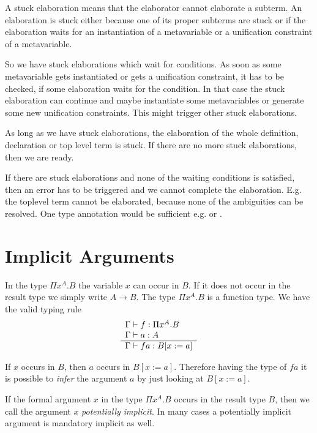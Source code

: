 A stuck elaboration means that the elaborator cannot elaborate a subterm. An
elaboration is stuck either because one of its proper subterms are stuck or if
the elaboration waits for an instantiation of a metavariable or a unification
constraint of a metavariable.

So we have stuck elaborations which wait for conditions. As soon as some
metavariable gets instantiated or gets a unification constraint, it has to be
checked, if some elaboration waits for the condition. In that case the stuck
elaboration can continue and maybe instantiate some metavariables or generate
some new unification constraints. This might trigger other stuck elaborations.

As long as we have stuck elaborations, the elaboration of the whole definition,
declaration or top level term is stuck. If there are no more stuck elaborations,
then we are ready.

If there are stuck elaborations and none of the waiting conditions is satisfied,
then an error has to be triggered and we cannot complete the elaboration. E.g.
the toplevel term  cannot be elaborated, because none of the
ambiguities can be resolved. One type annotation would be sufficient e.g.
 or .





\section{Implicit Arguments}


In the type $\Pi x^A. B$ the variable $x$ can occur in $B$. If it does not occur
in the result type we simply write $A \to B$. The type $\Pi x^A. B$ is a
function type. We have the valid typing rule
$$
\rulev{
    \Gamma \vdash f: \Pi x^A. B

    \\

    \Gamma \vdash a: A
}
{
    \Gamma \vdash f a: B[x:= a]
}
$$

If $x$ occurs in $B$, then $a$ occurs in $B[x:=a]$. Therefore having the type of
$f a$ it is possible to \emph{infer} the argument $a$ by just looking at
$B[x:=a]$.


If the formal argument $x$ in the type $\Pi x^A. B$ occurs in the result type
$B$, then we call the argument $x$ \emph{potentially implicit}. In many cases a
potentially implicit argument is mandatory implicit as well.

